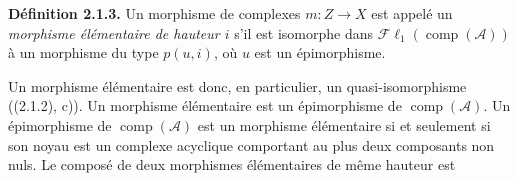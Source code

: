 \medskip\noindent\textbf{Définition 2.1.3.}\quad
Un morphisme de complexes $m\colon Z\longrightarrow X$ est appelé un
\emph{morphisme élémentaire de hauteur $i$} s'il est isomorphe dans
$\mathcal{F}\ell_1(\operatorname{comp}(\mathcal A))$ à un morphisme du type
$p(u,i)$, où $u$ est un épimorphisme.

Un morphisme élémentaire est donc, en particulier, un quasi-isomorphisme
((2.1.2), c)). Un morphisme élémentaire est un épimorphisme de
$\operatorname{comp}(\mathcal A)$. Un épimorphisme de
$\operatorname{comp}(\mathcal A)$ est un morphisme élémentaire si et seulement
si son noyau est un complexe acyclique comportant au plus deux composants
non nuls. Le composé de deux morphismes élémentaires de même hauteur est
\endgroup
